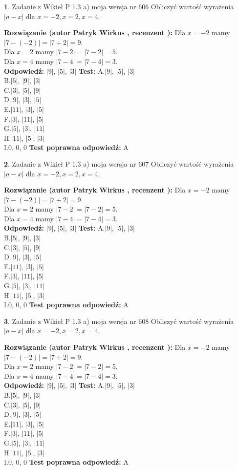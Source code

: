 \documentclass[12pt, a4paper]{article}
\theoremstyle{definition} %
\newtheorem{zad}{}
\newcommand{\zadStart}[1]{\begin{zad}#1\newline}
\newcommand{\zadStop}{\end{zad}}
\newcommand{\rozwStart}[2]{\noindent \textbf{Rozwiązanie (autor #1 , recenzent #2): }\newline}
\newcommand{\rozwStop}{\newline}
\newcommand{\odpStart}{\noindent \textbf{Odpowiedź:}\newline}
\newcommand{\odpStop}{\newline}
\newcommand{\testStart}{\noindent \textbf{Test:}\newline}
\newcommand{\testStop}{\newline}
\newcommand{\kluczStart}{\noindent \textbf{Test poprawna odpowiedź:}\newline}
\newcommand{\kluczStop}{\newline}
\begin{document}
\zadStart{Zadanie z Wikieł P 1.3 a) moja wersja nr 606}
Obliczyć wartość wyrażenia $|a - x|$ dla $x=-2,x=2,x=4$.
\zadStop
\rozwStart{Patryk Wirkus}{}
Dla $x = -2$ mamy $|7 - (-2)| = |7 + 2| = 9$.\\
Dla $x = 2$ mamy $|7 - 2| = |7 - 2| = 5$.\\
Dla $x = 4$ mamy $|7 - 4| = |7 - 4| = 3$.\\
\rozwStop
\odpStart
$|9|$, $|5|$, $|3|$
\odpStop
\testStart
A.$|9|$, $|5|$, $|3|$\\
B.$|5|$, $|9|$, $|3|$\\
C.$|3|$, $|5|$, $|9|$\\
D.$|9|$, $|3|$, $|5|$\\
E.$|11|$, $|3|$, $|5|$\\
F.$|3|$, $|11|$, $|5|$\\
G.$|5|$, $|3|$, $|11|$\\
H.$|11|$, $|5|$, $|3|$\\
I.$0$, $0$, $0$
\testStop
\kluczStart
A
\kluczStop



\zadStart{Zadanie z Wikieł P 1.3 a) moja wersja nr 607}
Obliczyć wartość wyrażenia $|a - x|$ dla $x=-2,x=2,x=4$.
\zadStop
\rozwStart{Patryk Wirkus}{}
Dla $x = -2$ mamy $|7 - (-2)| = |7 + 2| = 9$.\\
Dla $x = 2$ mamy $|7 - 2| = |7 - 2| = 5$.\\
Dla $x = 4$ mamy $|7 - 4| = |7 - 4| = 3$.\\
\rozwStop
\odpStart
$|9|$, $|5|$, $|3|$
\odpStop
\testStart
A.$|9|$, $|5|$, $|3|$\\
B.$|5|$, $|9|$, $|3|$\\
C.$|3|$, $|5|$, $|9|$\\
D.$|9|$, $|3|$, $|5|$\\
E.$|11|$, $|3|$, $|5|$\\
F.$|3|$, $|11|$, $|5|$\\
G.$|5|$, $|3|$, $|11|$\\
H.$|11|$, $|5|$, $|3|$\\
I.$0$, $0$, $0$
\testStop
\kluczStart
A
\kluczStop



\zadStart{Zadanie z Wikieł P 1.3 a) moja wersja nr 608}
Obliczyć wartość wyrażenia $|a - x|$ dla $x=-2,x=2,x=4$.
\zadStop
\rozwStart{Patryk Wirkus}{}
Dla $x = -2$ mamy $|7 - (-2)| = |7 + 2| = 9$.\\
Dla $x = 2$ mamy $|7 - 2| = |7 - 2| = 5$.\\
Dla $x = 4$ mamy $|7 - 4| = |7 - 4| = 3$.\\
\rozwStop
\odpStart
$|9|$, $|5|$, $|3|$
\odpStop
\testStart
A.$|9|$, $|5|$, $|3|$\\
B.$|5|$, $|9|$, $|3|$\\
C.$|3|$, $|5|$, $|9|$\\
D.$|9|$, $|3|$, $|5|$\\
E.$|11|$, $|3|$, $|5|$\\
F.$|3|$, $|11|$, $|5|$\\
G.$|5|$, $|3|$, $|11|$\\
H.$|11|$, $|5|$, $|3|$\\
I.$0$, $0$, $0$
\testStop
\kluczStart
A
\kluczStop
\end{document}
